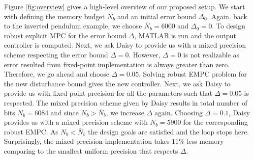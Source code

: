 	Figure \ref{fig:overview} gives a high-level overview of our proposed setup. We start with defining the memory budget $\bar N_b$ and an initial error bound $\Delta_0$. Again, back to the inverted pendulum example, we choose $\bar N_b=6000$ and $\Delta_0=0$. To design robust explicit MPC for the error bound $\Delta$, MATLAB is run and the output controller is computed. Next, we ask Daisy to provide us with a mixed precision scheme respecting the error bound $\Delta=0$. However, $\Delta=0$ is not realizable as error resulted from fixed-point implementation is always greater than zero. Therefore, we go ahead and choose $\Delta=0.05$. Solving robust EMPC problem for the new disturbance bound gives the new controller. Next, we ask Daisy to provide us with fixed-point precision for all the parameters such that $\Delta=0.05$ is respected. The mixed precision scheme given by Daisy results in total number of bits $N_b=6084$ and since $N_b>\bar N_b$, we increase $\Delta$ again. Choosing $\Delta=0.1$, Daisy provides us with a mixed precision scheme with $N_b=5900$ for the corresponding robust EMPC. As $N_b<\bar N_b$ the design goals are satisfied and the loop stops here. Surprisingly, the mixed precision implementation takes $11\%$ less memory comparing to the smallest uniform precision that respects $\Delta$. 
	
	
	
